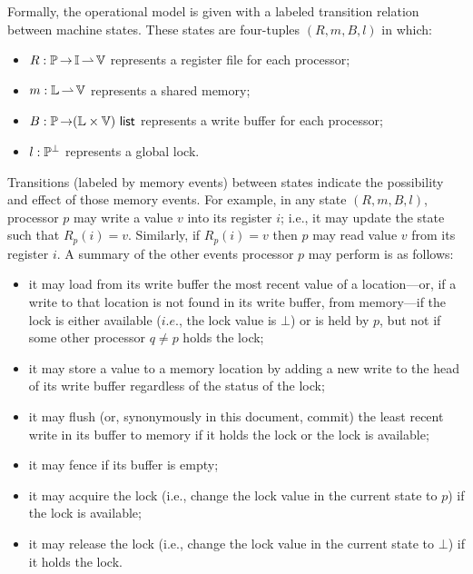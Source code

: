 \documentclass[11pt]{report}         %
\begin{document}
Formally, the operational model is given with a labeled transition relation between machine states. These states are four-tuples $(R,m,B,l)$ in which: \begin{itemize}
      \item $R : \mathbb{P} \operatorname{\rightarrow} \mathbb{I} \operatorname{\rightharpoonup} \mathbb{V}$ represents a register file for each processor;
      \item $m : \mathbb{L} \operatorname{\rightharpoonup} \mathbb{V}$ represents a shared memory; 
      \item $B : \mathbb{P} \operatorname{\rightarrow} (\mathbb{L} \times \mathbb{V})~\mathsf{list}$ represents a write buffer for each processor; 
      \item $l : \mathbb{P}^\bot$ represents a global lock. 
\end{itemize}

Transitions (labeled by memory events) between states indicate the possibility and effect of those memory events. For example, in any state $(R,m,B,l)$, processor $p$ may write a value $v$ into its register $i$; i.e., it may update the state such that $R_p(i) = v$. Similarly, if $R_p(i) = v$ then $p$ may read value $v$ from its register $i$. A summary of the other events processor $p$ may perform is as follows: \begin{itemize}
      \item it may load from its write buffer the most recent value of a location---or, if a write to that location is not found in its write buffer, from memory---if the lock is either available ($i.e.$, the lock value is $\bot$) or is held by $p$, but not if some other processor $q \neq p$ holds the lock;
      \item it may store a value to a memory location by adding a new write to the head of its write buffer regardless of the status of the lock; 
      \item it may flush (or, synonymously in this document, commit) the least recent write in its buffer to memory if it holds the lock or the lock is available;  
      \item it may fence if its buffer is empty;
      \item it may acquire the lock (i.e., change the lock value in the current state to $p$) if the lock is available; 
      \item it may release the lock (i.e., change the lock value in the current state to $\bot$) if it holds the lock.
\end{itemize}
\end{document}
